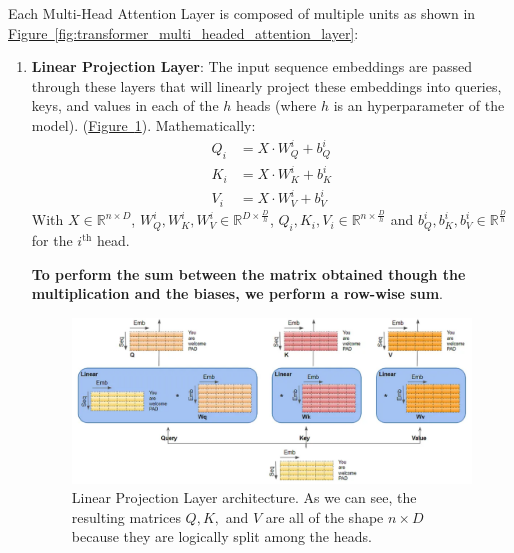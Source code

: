 \documentclass[12pt]{article}
\begin{document}
Each Multi-Head Attention Layer is composed of multiple units as shown in 
\hyperref[fig:transformer_multi_headed_attention_layer]{Figure~\ref*{fig:transformer_multi_headed_attention_layer}}:
\begin{enumerate}
    \item \textbf{Linear Projection Layer}: The input sequence embeddings are passed through these layers that 
    will linearly project these embeddings into queries, keys, and values in each of the $h$ heads (where 
    $h$ is an hyperparameter of the model).
    (\hyperref[fig:multi_head_linear_projection_layer]{Figure~\ref*{fig:multi_head_linear_projection_layer}}). 
    Mathematically:
    \begin{equation}
        \begin{aligned}
            Q_i &= X \cdot W_Q^i + b_Q^i \\
            K_i &= X \cdot W_K^i + b_K^i \\
            V_i &= X \cdot W_V^i + b_V^i
        \end{aligned}
        \label{eq:multi_head_attention_linear_projection_single_head}
    \end{equation}
    With $X \in \mathbb{R}^{n \times D}$, $W_Q^i, W_K^i, W_V^i \in \mathbb{R}^{D \times \frac{D}{h}}$, 
    $Q_i, K_i, V_i \in \mathbb{R}^{n \times \frac{D}{h}}$ and $b_Q^i, b_K^i, b_V^i \in \mathbb{R}^{\frac{D}{h}}$
    for the $i^{\text{th}}$ head.

    \textbf{To perform the sum between the matrix obtained though the multiplication and the biases, we 
    perform a row-wise sum}.

    \begin{figure}
        \centering
        \includegraphics[width=.9\textwidth]{Images/multi_head_linear_projection_layer.png}
        \caption{Linear Projection Layer architecture. As we can see, the resulting matrices $Q, K,$ and $V$ are all
        of the shape $n \times D$ because they are logically split among the heads.}
        \label{fig:multi_head_linear_projection_layer}
    \end{figure}


\end{enumerate}
\end{document}
